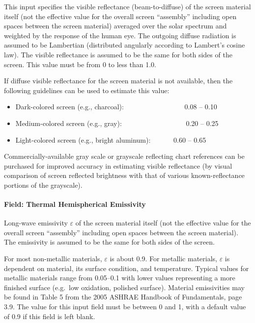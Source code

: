 This input specifies the visible reflectance (beam-to-diffuse) of the screen material itself (not the effective value for the overall screen ``assembly'' including open spaces between the screen material) averaged over the solar spectrum and weighted by the response of the human eye. The outgoing diffuse radiation is assumed to be Lambertian (distributed angularly according to Lambert's cosine law). The visible reflectance is assumed to be the same for both sides of the screen. This value must be from 0 to less than 1.0.

If diffuse visible reflectance for the screen material is not available, then the following guidelines can be used to estimate this value:

\begin{itemize}
\item
  Dark-colored screen (e.g., charcoal):~~~~~~~~~~~~~~~~~ 0.08 -- 0.10
\item
  Medium-colored screen (e.g., gray):~~~~~~~~~~~~~~~~~~ 0.20 -- 0.25
\item
  Light-colored screen (e.g., bright aluminum):~~~~~~ 0.60 -- 0.65
\end{itemize}

Commercially-available gray scale or grayscale reflecting chart references can be purchased for improved accuracy in estimating visible reflectance (by visual comparison of screen reflected brightness with that of various known-reflectance portions of the grayscale).

\paragraph{Field: Thermal Hemispherical Emissivity}\label{field-thermal-hemispherical-emissivity-1}

Long-wave emissivity \(\varepsilon\) of the screen material itself (not the effective value for the overall screen ``assembly'' including open spaces between the screen material). The emissivity is assumed to be the same for both sides of the screen.

For most non-metallic materials, \(\varepsilon\) is about 0.9. For metallic materials, \(\varepsilon\) is dependent on material, its surface condition, and temperature. Typical values for metallic materials range from 0.05--0.1 with lower values representing a more finished surface (e.g.~low oxidation, polished surface). Material emissivities may be found in Table 5 from the 2005 ASHRAE Handbook of Fundamentals, page 3.9. The value for this input field must be between 0 and 1, with a default value of 0.9 if this field is left blank.

